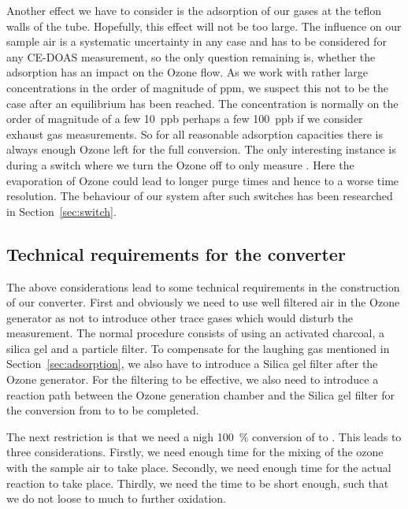 Another effect we have to consider is the adsorption of our gases at
the teflon walls of the tube. Hopefully, this effect will not be too
large. The influence on our sample air is a systematic uncertainty in
any case and has to be considered for any CE-DOAS measurement, so the
only question remaining is, whether the adsorption has an impact on
the Ozone flow. As we work with rather large concentrations in the
order of magnitude of \si{ppm}, we suspect this not to be the case
after an equilibrium has been reached. The  concentration is
normally on the order of magnitude of a few \SI{10}{ppb} perhaps a few
\SI{100}{ppb} if we consider exhaust gas measurements. So for all
reasonable adsorption capacities there is always enough Ozone left for
the full conversion. The only interesting instance is during a switch
where we turn the Ozone off to only measure . Here the
evaporation of Ozone could lead to longer purge times and hence to a
worse time resolution. The behaviour of our system after such switches
has been researched in Section~\ref{sec:switch}.

\subsection{Technical requirements for the converter}
\label{sec:requirements}

The above considerations lead to some technical requirements in the
construction of our converter. First and obviously we need to use well
filtered air in the Ozone generator as not to introduce other trace
gases which would disturb the measurement. The normal procedure
consists of using an activated charcoal, a silica gel and a particle
filter. To compensate for the laughing gas mentioned in
Section~\ref{sec:adsorption}, we also have to introduce a Silica gel
filter after the Ozone generator. For the filtering to be effective,
we also need to introduce a reaction path between the Ozone generation
chamber and the Silica gel filter for the conversion from  to
 to be completed.

The next restriction is that we need a nigh \SI{100}{\%} conversion of
 to . This leads to three considerations. Firstly, we
need enough time for the mixing of the ozone with the sample air to
take place. Secondly, we need enough time for the actual reaction to
take place. Thirdly, we need the time to be short enough, such that we
do not loose to much  to further oxidation.

